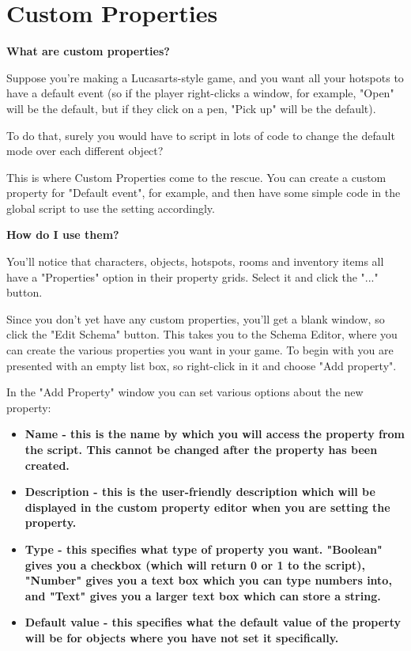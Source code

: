 \section{Custom Properties}%

\bf{What are custom properties?}

Suppose you're making a Lucasarts-style game, and you want all your hotspots to have
a default event (so if the player right-clicks a window, for example, "Open" will be
the default, but if they click on a pen, "Pick up" will be the default).

To do that, surely you would have to script in lots of code to change the default mode
over each different object?

This is where Custom Properties come to the rescue. You can create a custom property
for "Default event", for example, and then have some simple code in the global script
to use the setting accordingly.

\bf{How do I use them?}

You'll notice that characters, objects, hotspots, rooms and inventory items all have
a "Properties" option in their property grids. Select it and click the "..." button.

Since you don't yet have any custom properties, you'll get a blank window, so
click the "Edit Schema" button. This takes you to the Schema Editor, where you
can create the various properties you want in your game. To begin with you are
presented with an empty list box, so right-click in it and choose "Add property".

In the "Add Property" window you can set various options about the new property:
\begin{itemize}
\item \bf{Name} - this is the name by which you will access the property from the script.
This cannot be changed after the property has been created.
\item \bf{Description} - this is the user-friendly description which will be displayed
in the custom property editor when you are setting the property.
\item \bf{Type} - this specifies what type of property you want. "Boolean" gives you
a checkbox (which will return 0 or 1 to the script), "Number" gives you a text box which
you can type numbers into, and "Text" gives you a larger text box which can store a string.
\item \bf{Default value} - this specifies what the default value of the property will be
for objects where you have not set it specifically.
\end{itemize}

